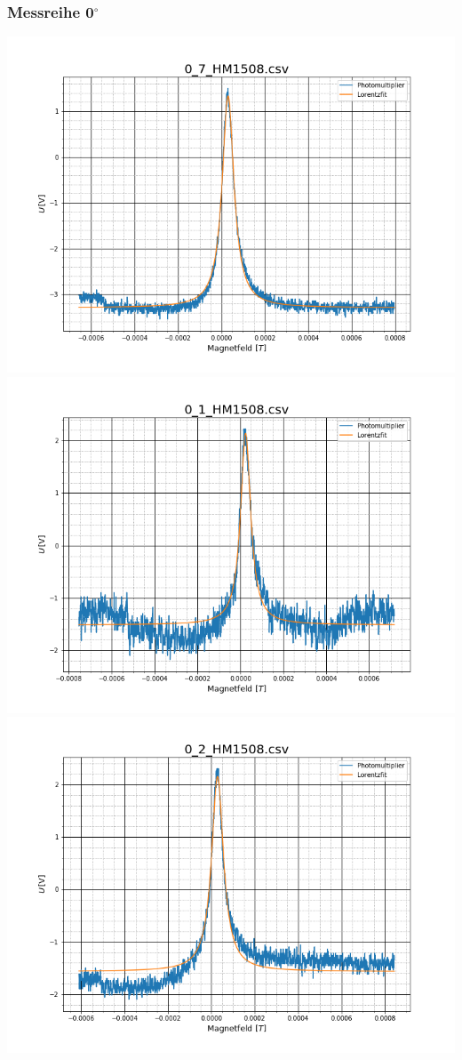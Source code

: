 \subsubsection{Messreihe 0$^\circ$}
\includegraphics[scale=0.3]{Bild/Anhang/Abkuhlung_2/abk_2_01}
\includegraphics[scale=0.3]{Bild/Anhang/Abkuhlung_2/abk_2_02}\\
\includegraphics[scale=0.3]{Bild/Anhang/Abkuhlung_2/abk_2_03}
